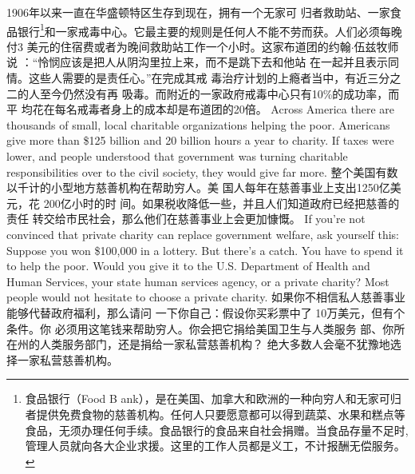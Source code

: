 \begin{paracol}{2}
1906年以来一直在华盛顿特区生存到现在，拥有一个无家可
归者救助站、一家食品银行\footnote{食品银行（Food B ank），是在美国、加拿大和欧洲的一种向穷人和无家可归者提供免费食物的慈善机构。任何人只要愿意都可以得到蔬菜、水果和糕点等食品，无须办理任何手续。食品银行的食品来自社会捐赠。当食品存量不足时,管理人员就向各大企业求援。这里的工作人员都是义工，不计报酬无偿服务。}和一家戒毒中心。它最主要的规则是任何人不能不劳而获。人们必须每晚付3 美元的住宿费或者为晚间救助站工作一个小时。这家布道团的约翰$\cdot$伍兹牧师
说 ：“怜悯应该是把人从阴沟里拉上来，而不是跳下去和他站
在一起并且表示同情。这些人需要的是责任心。”在完成其戒
毒治疗计划的上瘾者当中，有近三分之二的人至今仍然没有再
吸毒。而附近的一家政府戒毒中心只有10\%的成功率，而平
均花在每名戒毒者身上的成本却是布道团的20倍。
\switchcolumn*
Across America there are thousands of small, local charitable
organizations helping the poor. Americans give more than
\$125 billion and 20 billion hours a year to charity. If taxes were
lower, and people understood that government was turning
charitable responsibilities over to the civil society, they would
give far more.
\switchcolumn
整个美国有数以千计的小型地方慈善机构在帮助穷人。美
国人每年在慈善事业上支出1250亿美元，花 200亿小时的时
间。如果税收降低一些，并且人们知道政府已经把慈善的责任
转交给市民社会，那么他们在慈善事业上会更加慷慨。
\switchcolumn*
If you're not convinced that private charity can replace government welfare, ask yourself this: Suppose you won \$100,000
in a lottery. But there's a catch. You have to spend it to help the
poor. Would you give it to the U.S. Department of Health and
Human Services, your state human services agency, or a private
charity? Most people would not hesitate to choose a private
charity.
\switchcolumn
如果你不相信私人慈善事业能够代替政府福利，那么请问
一下你自己：假设你买彩票中了 10万美元，但有个条件。你
必须用这笔钱来帮助穷人。你会把它捐给美国卫生与人类服务
部、你所在州的人类服务部门，还是捐给一家私营慈善机构？
绝大多数人会毫不犹豫地选择一家私营慈善机构。



\end{paracol}
